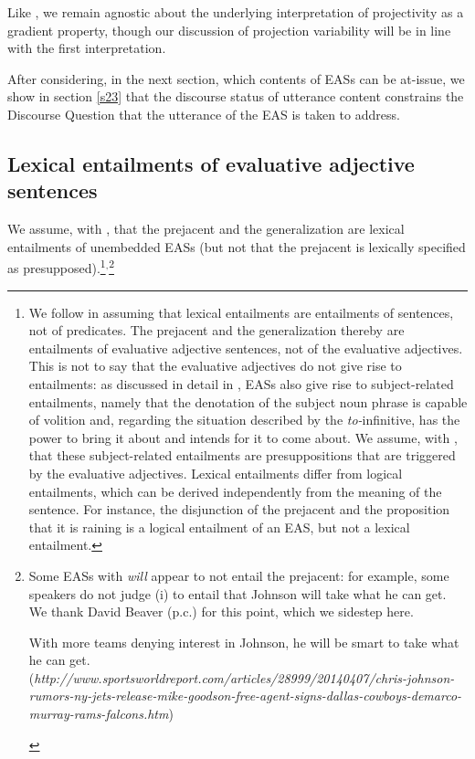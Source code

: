 \documentclass[11pt,fleqn]{article}
\newcommand{\6}{\mbox{$[\hspace*{-.6mm}[$}}
\newcommand{\9}{\mbox{$]\hspace*{-.6mm}]$}}
\begin{document}
Like \citealt{tbd-variability}, we remain agnostic about the underlying interpretation of projectivity as a gradient property, though our discussion of projection variability will be in line with the first interpretation.

After considering, in the next section, which contents of EASs can be at-issue, we show in section \ref{s23} that the discourse status of utterance content constrains the Discourse Question that the utterance of the EAS is taken to address.


\subsection{Lexical entailments of evaluative adjective sentences}\label{s22}

We assume, with \citealt{barker02}, that the prejacent and the generalization are lexical entailments of unembedded EASs (but not that the prejacent is lexically specified as presupposed).\footnote{We follow \citealt{abrusan2011} in assuming that lexical entailments are entailments of sentences, not of predicates. The prejacent and the generalization thereby are entailments of evaluative adjective sentences, not of the evaluative adjectives. This is not to say that the evaluative adjectives do not give rise to entailments: as discussed in detail in \citealt[\S4.2]{barker02}, EASs also give rise to subject-related entailments, namely that the denotation of the subject noun phrase is capable of volition and, regarding the situation described by the {\em to-}infinitive, has the power to bring it about and intends for it to come about.  We assume, with \citet{barker02}, that these subject-related entailments are presuppositions that are triggered by the evaluative adjectives. Lexical entailments differ from logical entailments, which can be derived independently from the meaning of the sentence. For instance, the disjunction of the prejacent and the proposition that it is raining is a logical entailment of an EAS, but not a lexical entailment.}$^{,}$\footnote{Some EASs with {\em will} appear to not entail the prejacent: for example, some speakers do not judge (i) to entail that Johnson will take what he can get. We thank David Beaver (p.c.) for this point, which we sidestep here.
\begin{exe}
 With more teams denying interest in Johnson, he will be smart
to take what he can get. \\ ({\em http://www.sportsworldreport.com/articles/28999/20140407/chris-johnson-rumors-ny-jets-release-mike-goodson-free-agent-signs-dallas-cowboys-demarco-murray-rams-falcons.htm})
\end{exe}} 
\end{document}

